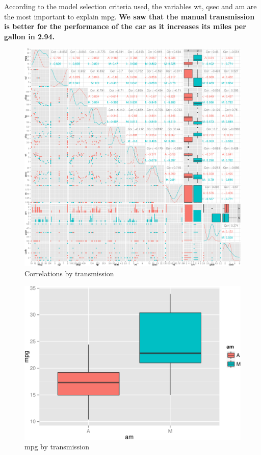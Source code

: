 \documentclass[]{article}
\begin{document}
According to the model selection criteria used, the variables wt, qsec
and am are the most important to explain mpg.
\textbf{We saw that the manual transmission is better for the performance of the car as it increases its miles per gallon in 2.94.}

\begin{figure}

{\centering \includegraphics{Regression_Models_Project_files/figure-latex/cor_matrix-1} 

}

\caption{Correlations by transmission}\label{fig:cor_matrix}
\end{figure}

\begin{figure}

{\centering \includegraphics[width=.6\textwidth]{Regression_Models_Project_files/figure-latex/mpg_by_trans-1} 

}

\caption{mpg by transmission}\label{fig:mpg_by_trans}
\end{figure}
\end{document}
